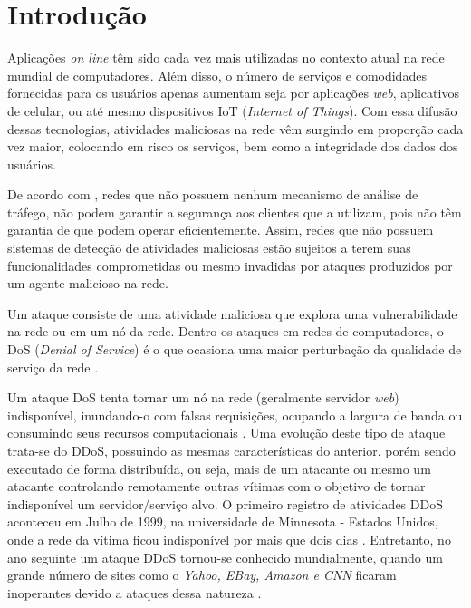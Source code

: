 \chapter[Introdução]{Introdução}
\label{introducao}

Aplicações \textit{on line} têm sido cada vez mais utilizadas no contexto atual na rede mundial de computadores. Além disso, o número de serviços e comodidades fornecidas para os usuários apenas aumentam seja por aplicações \textit{web}, aplicativos de celular, ou até mesmo dispositivos IoT (\textit{Internet of Things}). Com essa difusão dessas tecnologias, atividades maliciosas na rede vêm surgindo em proporção cada vez maior, colocando em risco os serviços, bem como a integridade dos dados dos usuários. 

De acordo com , redes que não possuem nenhum mecanismo de análise de tráfego, não podem garantir a segurança aos clientes que a utilizam, pois não têm garantia de que podem operar eficientemente. Assim, redes que não possuem sistemas de detecção de atividades maliciosas estão sujeitos a terem suas funcionalidades comprometidas ou mesmo invadidas por ataques produzidos por um agente malicioso na rede.

Um ataque consiste de uma atividade maliciosa que explora uma vulnerabilidade na rede ou em um nó da rede. Dentro os ataques em redes de computadores, o DoS (\textit{Denial of Service}) é o que ocasiona uma maior perturbação da qualidade de serviço da rede \cite{badishi2006exposing}.

Um ataque DoS tenta tornar um nó na rede (geralmente servidor \textit{web}) indisponível, inundando-o com falsas requisições, ocupando a largura de banda ou consumindo seus recursos computacionais \cite{1638123}. Uma evolução deste tipo de ataque trata-se do DDoS, possuindo as mesmas características do anterior, porém sendo executado de forma distribuída, ou seja, mais de um atacante ou mesmo um atacante controlando remotamente outras vítimas com o objetivo de tornar indisponível um servidor/serviço alvo. O primeiro registro de atividades DDoS aconteceu em Julho de 1999, na universidade de Minnesota - Estados Unidos, onde a rede da vítima ficou indisponível por mais que dois dias \cite{srivastava2011recent}. Entretanto, no ano seguinte um ataque DDoS tornou-se conhecido mundialmente, quando um grande número de sites como o \textit{Yahoo, EBay, Amazon e CNN} ficaram inoperantes devido a ataques dessa natureza \cite{calce2008mafiaboy}.

